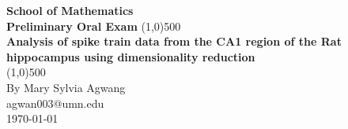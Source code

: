 


\begin{titlepage}
\begin{center}
\vspace*{1cm}  %
\Large{\textbf{School of Mathematics}}\\ %
\Large{\textbf{Preliminary Oral Exam}} %
\vfill %
\line(1,0){500}\\[1mm]
\huge{\textbf{ Analysis of spike train data from the CA1 region of the Rat  hippocampus
using dimensionality reduction}}\\[3mm]
\line(1,0){500}\\
\vfill %
By Mary Sylvia Agwang\\
agwan003@umn.edu\\
\today %

\end{center}
\end{titlepage}

















